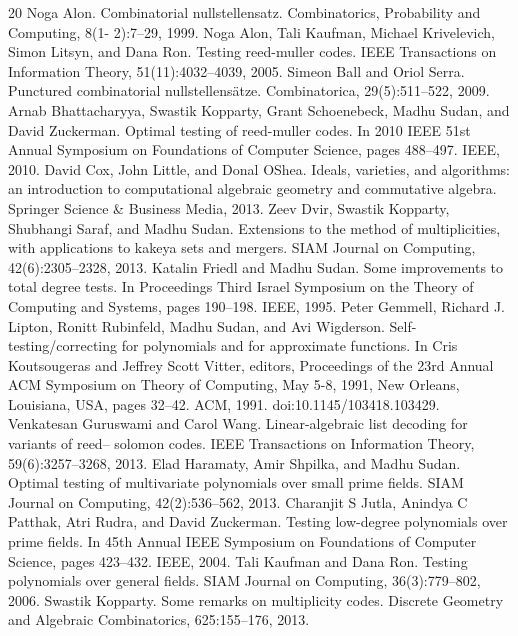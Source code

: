 \begin{thebibliography}{20}
 Noga Alon. Combinatorial nullstellensatz. Combinatorics, Probability and Computing, 8(1- 2):7–29, 1999.
 Noga Alon, Tali Kaufman, Michael Krivelevich, Simon Litsyn, and Dana Ron. Testing reed-muller codes. IEEE Transactions on Information Theory, 51(11):4032–4039, 2005.
 Simeon Ball and Oriol Serra. Punctured combinatorial nullstellensätze. Combinatorica, 29(5):511–522, 2009.
 Arnab Bhattacharyya, Swastik Kopparty, Grant Schoenebeck, Madhu Sudan, and David Zuckerman. Optimal testing of reed-muller codes. In 2010 IEEE 51st Annual Symposium on Foundations of Computer Science, pages 488–497. IEEE, 2010.
 David Cox, John Little, and Donal OShea. Ideals, varieties, and algorithms: an introduction to computational algebraic geometry and commutative algebra. Springer Science \& Business Media, 2013.
 Zeev Dvir, Swastik Kopparty, Shubhangi Saraf, and Madhu Sudan. Extensions to the method of multiplicities, with applications to kakeya sets and mergers. SIAM Journal on Computing, 42(6):2305–2328, 2013.
 Katalin Friedl and Madhu Sudan. Some improvements to total degree tests. In Proceedings Third Israel Symposium on the Theory of Computing and Systems, pages 190–198. IEEE, 1995.
 Peter Gemmell, Richard J. Lipton, Ronitt Rubinfeld, Madhu Sudan, and Avi Wigderson. Self-testing/correcting for polynomials and for approximate functions. In Cris Koutsougeras and Jeffrey Scott Vitter, editors, Proceedings of the 23rd Annual ACM Symposium on Theory of Computing, May 5-8, 1991, New Orleans, Louisiana, USA, pages 32–42. ACM, 1991. doi:10.1145/103418.103429.
 Venkatesan Guruswami and Carol Wang. Linear-algebraic list decoding for variants of reed– solomon codes. IEEE Transactions on Information Theory, 59(6):3257–3268, 2013.
 Elad Haramaty, Amir Shpilka, and Madhu Sudan. Optimal testing of multivariate polynomials over small prime fields. SIAM Journal on Computing, 42(2):536–562, 2013.
 Charanjit S Jutla, Anindya C Patthak, Atri Rudra, and David Zuckerman. Testing low-degree polynomials over prime fields. In 45th Annual IEEE Symposium on Foundations of Computer Science, pages 423–432. IEEE, 2004.
 Tali Kaufman and Dana Ron. Testing polynomials over general fields. SIAM Journal on Computing, 36(3):779–802, 2006.
 Swastik Kopparty. Some remarks on multiplicity codes. Discrete Geometry and Algebraic Combinatorics, 625:155–176, 2013.

\end{thebibliography}
